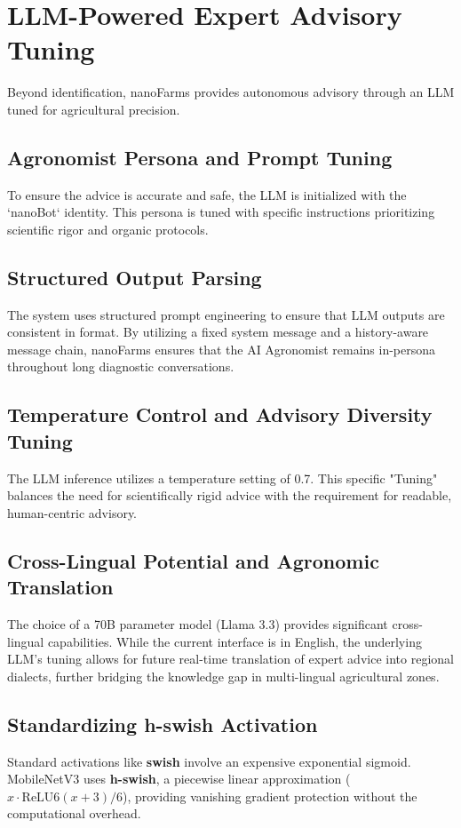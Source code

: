 \documentclass[11pt,onecolumn]{article}
\begin{document}
 \section{LLM-Powered Expert Advisory Tuning}
Beyond identification, nanoFarms provides autonomous advisory through an LLM tuned for agricultural precision.

\subsection{Agronomist Persona and Prompt Tuning}
To ensure the advice is accurate and safe, the LLM is initialized with the `nanoBot` identity. This persona is tuned with specific instructions prioritizing scientific rigor and organic protocols.

\subsection{Structured Output Parsing}
The system uses structured prompt engineering to ensure that LLM outputs are consistent in format. By utilizing a fixed system message and a history-aware message chain, nanoFarms ensures that the AI Agronomist remains in-persona throughout long diagnostic conversations.

\subsection{Temperature Control and Advisory Diversity Tuning}
The LLM inference utilizes a temperature setting of 0.7. This specific "Tuning" balances the need for scientifically rigid advice with the requirement for readable, human-centric advisory.

\subsection{Cross-Lingual Potential and Agronomic Translation}
The choice of a 70B parameter model (Llama 3.3) provides significant cross-lingual capabilities. While the current interface is in English, the underlying LLM's tuning allows for future real-time translation of expert advice into regional dialects, further bridging the knowledge gap in multi-lingual agricultural zones.

\subsection{Standardizing h-swish Activation}
Standard activations like \textbf{swish} involve an expensive exponential sigmoid. MobileNetV3 uses \textbf{h-swish}, a piecewise linear approximation ($x \cdot \text{ReLU}6(x+3)/6$), providing vanishing gradient protection without the computational overhead.
\end{document}
